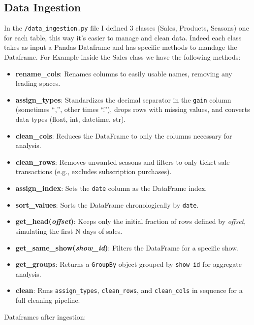 \documentclass[a4paper,12pt]{report}  %
\begin{document}
\subsection{Data Ingestion}
In the \verb|/data_ingestion.py| file I defined 3 classes (Sales, Products, Seasons) one for each table, this way it's easier to manage and clean data.
Indeed each class takes as input a Pandas Dataframe and has specific methods to mandage the Dataframe.
For Example inside the Sales class we have the following methods:
\begin{itemize}
	\item \textbf{rename\_cols}: Renames columns to easily usable names, removing any leading spaces.
	\item \textbf{assign\_types}: Standardizes the decimal separator in the \texttt{gain} column (sometimes “,”, other times “.”), drops rows with missing values, and converts data types (float, int, datetime, str).
	\item \textbf{clean\_cols}: Reduces the DataFrame to only the columns necessary for analysis.
	\item \textbf{clean\_rows}: Removes unwanted seasons and filters to only ticket‐sale transactions (e.g., excludes subscription purchases).
	\item \textbf{assign\_index}: Sets the \texttt{date} column as the DataFrame index.
	\item \textbf{sort\_values}: Sorts the DataFrame chronologically by \texttt{date}.
	\item \textbf{get\_head(\emph{offset})}: Keeps only the initial fraction of rows defined by \emph{offset}, simulating the first N days of sales.
	\item \textbf{get\_same\_show(\emph{show\_id})}: Filters the DataFrame for a specific show.
	\item \textbf{get\_groups}: Returns a \texttt{GroupBy} object grouped by \texttt{show\_id} for aggregate analysis.
	\item \textbf{clean}: Runs \texttt{assign\_types}, \texttt{clean\_rows}, and \texttt{clean\_cols} in sequence for a full cleaning pipeline.
\end{itemize}

Dataframes after ingestion:
\end{document}
